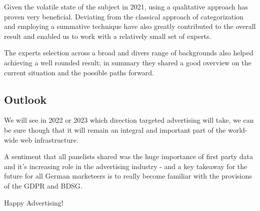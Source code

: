 Given the volatile state of the subject in 2021, using a qualitative approach has proven very beneficial. Deviating from the classical approach of categorization and employing a summative technique have also greatly contributed to the overall result and enabled us to work with a relatively small set of experts.

The experts selection across a broad and divers range of backgrounds also helped achieving a well rounded result; in summary they shared a good overview on the current situation and the possible paths forward. 

\subsection{Outlook}

We will see in 2022 or 2023 which direction targeted advertising will take, we can be sure though that it will remain an integral and important part of the world-wide web infrastructure.

A sentiment that all panelists shared was the huge importance of first party data and it's increasing role in the advertising industry - and a key takeaway for the future for all German marketeers is to really become familiar with the provisions of the GDPR and BDSG.

Happy Advertising!

